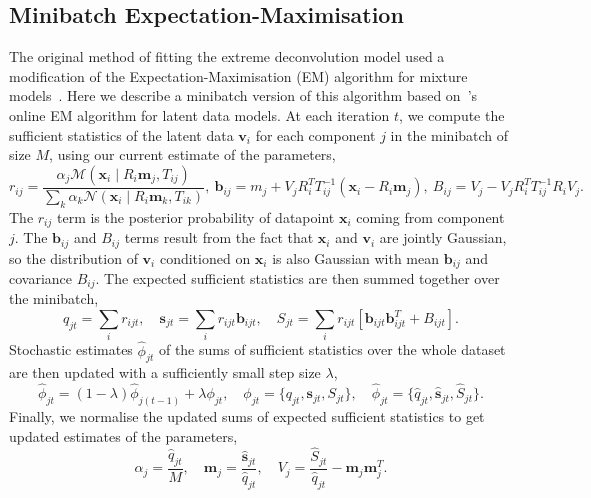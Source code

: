 \documentclass{article}
\newcommand{\bx}{\mathbf{x}}
\newcommand{\bv}{\mathbf{v}}
\newcommand{\bm}{\mathbf{m}}
\newcommand{\bb}{\mathbf{b}}
\newcommand{\bs}{\mathbf{s}}
\begin{document}
\subsection{Minibatch Expectation-Maximisation}
\label{sec:minibatch-em}
The original method of fitting the extreme deconvolution model used a modification of the Expectation-Maximisation (EM) algorithm for mixture models~\cite{dempsterMaximumLikelihoodIncomplete1977}.
Here we describe a minibatch version of this algorithm based on~\citet{cappeOnlineExpectationMaximization2009}'s online EM algorithm for latent data models.
At each iteration $t$, we compute the sufficient statistics of the latent data $\bv_i$ for each component $j$ in the minibatch of size $M$, using our current estimate of the parameters,
\begin{equation}
r_{ij} = \frac{\alpha_{j} \mathcal{M}(\bx_i \mid R_i\bm_j, T_{ij})}{\sum_k \alpha_k \mathcal{N}(\bx_i \mid R_i\bm_k, T_{ik})}, \ 
\bb_{ij} = m_j + V_j R_i^T T_{ij}^{-1}(\bx_i - R_i \bm_j), \ 
B_{ij} = V_j - V_j R_i^T T_{ij}^{-1}R_iV_j.
\end{equation}
The $r_{ij}$ term is the posterior probability of datapoint $\bx_i$ coming from component $j$.
The $\bb_{ij}$ and $B_{ij}$ terms result from the fact that $\bx_i$ and $\bv_i$ are jointly Gaussian, so the distribution of $\bv_i$ conditioned on $\bx_i$ is also Gaussian with mean $\bb_{ij}$ and covariance $B_{ij}$.
The expected sufficient statistics are then summed together over the minibatch,
\begin{equation}
q_{jt} = \sum_i r_{ijt}, \quad
\bs_{jt} = \sum_i r_{ijt} \bb_{ijt}, \quad
S_{jt} = \sum_i r_{ijt} [\bb_{ijt}\bb_{ijt}^T + B_{ijt}].
\end{equation}
Stochastic estimates $\hat{\phi}_{jt} $ of the sums of sufficient statistics over the whole dataset are then updated with a sufficiently small step size $\lambda$,
\begin{equation}
\hat{\phi}_{jt} = (1 - \lambda)\hat{\phi}_{j(t-1)} + \lambda \phi_{jt},\quad
\phi_{jt} = \{q_{jt}, \bs_{jt}, S_{jt} \},\quad
\hat{\phi}_{jt} = \{\hat{q}_{jt}, \hat{\bs}_{jt}, \hat{S}_{jt} \}. \label{eq:sums}
\end{equation}
Finally, we normalise the updated sums of expected sufficient statistics to get updated estimates of the parameters,
\begin{equation}
\alpha_{j} = \frac{\hat{q}_{jt}}{M}, \quad
\bm_{j} = \frac{\hat{\bs}_{jt}}{\hat{q}_{jt}}, \quad
V_{j} = \frac{\hat{S}_{jt}}{\hat{q}_{jt}} - \bm_{j} \bm_{j}^T.
\label{eqn:mstep}
\end{equation}
\end{document}
